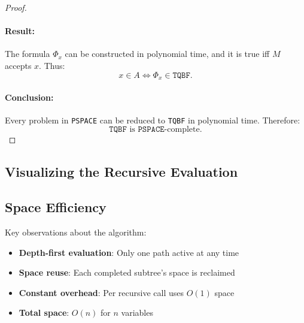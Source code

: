 \begin{proof}
    \paragraph{Result:}
    The formula $\Phi_x$ can be constructed in polynomial time, and it is true iff $M$ accepts $x$. Thus:
    \[
    x \in A \iff \Phi_x \in \texttt{TQBF}.
    \]
    
    \paragraph{Conclusion:}
    Every problem in \texttt{PSPACE} can be reduced to \texttt{TQBF} in polynomial time. Therefore:
    \[
    \texttt{TQBF} \text{ is } \texttt{PSPACE}\text{-complete}.
    \]
    \end{proof}
    
\subsection{Visualizing the Recursive Evaluation}

\begin{center}
\end{center}

\subsection{Space Efficiency}

Key observations about the algorithm:
\begin{itemize}
    \item \textbf{Depth-first evaluation}: Only one path active at any time
    \item \textbf{Space reuse}: Each completed subtree's space is reclaimed
    \item \textbf{Constant overhead}: Per recursive call uses $O(1)$ space
    \item \textbf{Total space}: $O(n)$ for $n$ variables
\end{itemize}

